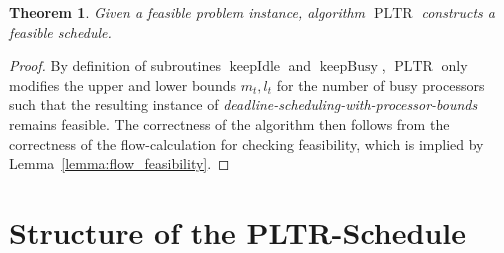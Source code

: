 \documentclass[a4paper]{article}
\DeclareMathOperator{\PLTR}{PLTR}
\DeclareMathOperator{\keepidle}{keepIdle}
\DeclareMathOperator{\keepbusy}{keepBusy}
\newtheorem{theorem}{Theorem}
\begin{document}
\begin{theorem}\label{theorem:feasibility}
  Given a feasible problem instance, algorithm $\PLTR$ constructs a feasible schedule.
\end{theorem}
\begin{proof}
  By definition of subroutines $\keepidle$ and $\keepbusy$, $\PLTR$ only modifies the upper and lower bounds $m_t, l_t$ for the number of busy processors such that the resulting instance of \emph{deadline-scheduling-with-processor-bounds} remains feasible.
  The correctness of the algorithm then follows from the correctness of the flow-calculation for checking feasibility, which is implied by Lemma~\ref{lemma:flow_feasibility}.
\end{proof}

\section{Structure of the PLTR-Schedule}\label{section:structure}
\end{document}
